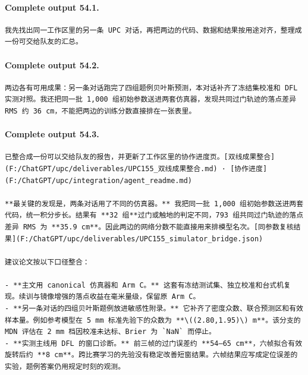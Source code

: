 \documentclass[UTF8,10pt]{ctexart}
\begin{document}
\paragraph{Complete output 54.1.}
\begin{Verbatim}[breaklines=true,breakanywhere=true,fontsize=\scriptsize,frame=single,framesep=2pt]
我先找出同一工作区里的另一条 UPC 对话，再把两边的代码、数据和结果按用途对齐，整理成一份可交给队友的汇总。
\end{Verbatim}

\paragraph{Complete output 54.2.}
\begin{Verbatim}[breaklines=true,breakanywhere=true,fontsize=\scriptsize,frame=single,framesep=2pt]
两边各有可用成果：另一条对话跑完了四组题例贝叶斯预测，本对话补齐了冻结集校准和 DFL 实测对照。我还把同一批 1,000 组初始参数送进两套仿真器，发现共同过门轨迹的落点差异 RMS 约 36 cm，不能把两边的训练分数直接排在一张表里。
\end{Verbatim}

\paragraph{Complete output 54.3.}
\begin{Verbatim}[breaklines=true,breakanywhere=true,fontsize=\scriptsize,frame=single,framesep=2pt]
已整合成一份可以交给队友的报告，并更新了工作区里的协作进度页。[双线成果整合](F:/ChatGPT/upc/deliverables/UPC155_双线成果整合.md) · [协作进度](F:/ChatGPT/upc/integration/agent_readme.md)

**最关键的发现是，两条对话用了不同的仿真器。** 我把同一批 1,000 组初始参数送进两套代码，统一积分步长。结果有 **32 组**过门或触地的判定不同，793 组共同过门轨迹的落点差异 RMS 为 **35.9 cm**。因此两边的网络分数不能直接用来排模型名次。[同参数复核结果](F:/ChatGPT/upc/deliverables/UPC155_simulator_bridge.json)

建议论文按以下口径整合：

- **主文用 canonical 仿真器和 Arm C。** 这套有冻结测试集、独立校准和台式机复现。续训与镜像增强的落点收益在毫米量级，保留原 Arm C。
- **另一条对话的四组贝叶斯题例放进敏感性附录。** 它补齐了密度众数、联合预测区和有效样本量。例如参考模型在 5 mm 标准先验下的众数为 **\((2.80,1.95)\) m**。该分支的 MDN 评估在 2 mm 档因校准未达标、Brier 为 `NaN` 而停止。
- **实测主线用 DFL 的窗口诊断。** 前三帧的过门误差约 **54–65 cm**，六帧拟合有效旋转后约 **8 cm**。跨比赛学习的先验没有稳定改善短窗结果。六帧结果应写成定位误差的实验，题例答案仍用规定时刻的观测。
\end{Verbatim}
\end{document}

